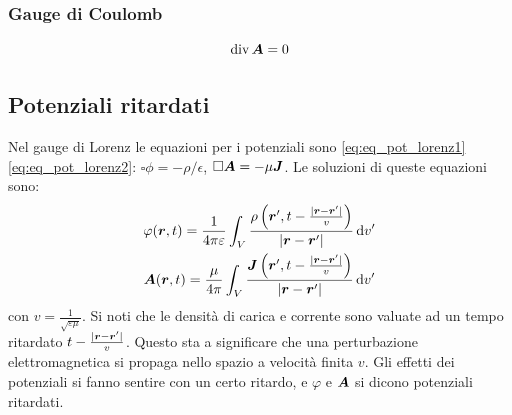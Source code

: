 \subsubsection{Gauge di Coulomb}
\begin{equation}
  \operatorname{div}\boldsymbol{A}=0
\end{equation}


\subsection{Potenziali ritardati}
Nel gauge di Lorenz le equazioni per i potenziali sono \eqref{eq:eq_pot_lorenz1} \eqref{eq:eq_pot_lorenz2}: $\square\phi=-\rho/\epsilon$, $\square\boldsymbol{A}=-\mu\boldsymbol{J}$. Le soluzioni di queste equazioni sono:
\begin{gather}
  \varphi(\boldsymbol{r},t)=\frac{1}{4\pi\varepsilon}\int_V\frac{\rho\left(\boldsymbol{r}', t-\frac{|\boldsymbol{r}-\boldsymbol{r}'|}{v}\right)}{|\boldsymbol{r}-\boldsymbol{r}'|}\,\mathrm{d} v'\label{eq:potenziali_ritardati1}\\
  \boldsymbol{A}(\boldsymbol{r},t)=\frac{\mu}{4\pi}\int_V\frac{\boldsymbol{J}\left(\boldsymbol{r}', t-\frac{|\boldsymbol{r}-\boldsymbol{r}'|}{v}\right)}{|\boldsymbol{r} - \boldsymbol{r}'|}\,\mathrm{d} v'\label{eq:potenziali_ritardati2}
\end{gather}
con $v=\frac{1}{\sqrt{\varepsilon\mu}}$. Si noti che le densità di carica e corrente sono valuate ad un tempo ritardato $t-\frac{|\boldsymbol{r}-\boldsymbol{r}'|}{v}$. Questo sta a significare che una perturbazione elettromagnetica si propaga nello spazio a velocità finita $v$. Gli effetti dei potenziali si fanno sentire con un certo ritardo, e $\varphi$ e $\boldsymbol{A}$ si dicono potenziali ritardati.
